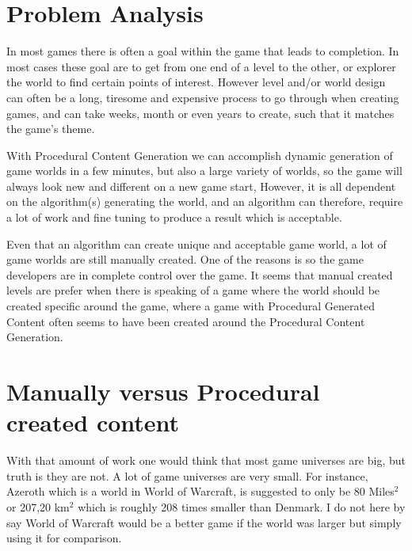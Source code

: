 \section{Problem Analysis}

In most games there is often a goal within the game that leads to completion. In most cases these goal are to get from one end of a level to the other, or explorer the world to find certain points of interest. However level and/or world design can often be a long, tiresome and expensive process to go through when creating games, and can take weeks, month or even years to create, such that it matches the game's theme.

With Procedural Content Generation we can accomplish dynamic generation of game worlds in a few minutes, but also a large variety of worlds, so the game will always look new and different on a new game start, However, it is all dependent on the algorithm(s) generating the world, and an algorithm can therefore, require a lot of work and fine tuning to produce a result which is acceptable.

Even that an algorithm can create unique and acceptable game world, a lot of game worlds are still manually created. One of the reasons is so the game developers are in complete control over the game. It seems that manual created levels are prefer when there is speaking of a game where the world should be created specific around the game, where a game with Procedural Generated Content often seems to have been created around the Procedural Content Generation.


\section{Manually versus Procedural created content}

With that amount of work one would think that most game universes are big, but truth is they are not. A lot of game universes are very small. For instance, Azeroth which is a world in World of Warcraft, is suggested to only be 80 Miles$^2$ or 207,20 km$^2$ \cite{GameWorldSize} which is roughly 208 times smaller than Denmark. I do not here by say World of Warcraft would be a better game if the world was larger but simply using it for comparison.


